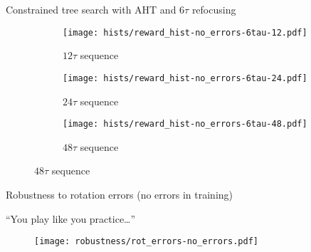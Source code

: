 \documentclass{beamer}
\begin{document}
\begin{frame}{Constrained tree search with AHT and $6\tau$ refocusing}
%
\begin{figure}[H]
    \centering
    \begin{subfigure}{.49\textwidth}
        \centering
        \texttt{[image: hists/reward\_hist-no\_errors-6tau-12.pdf]}
        \caption{$12\tau$ sequence}
        \label{fig:reward_hist-no_errors-6tau-12}
    \end{subfigure}
    \begin{subfigure}{.49\textwidth}
        \centering
        \texttt{[image: hists/reward\_hist-no\_errors-6tau-24.pdf]}
        \caption{$24\tau$ sequence}
        \label{fig:reward_hist-no_errors-6tau-24}
    \end{subfigure}
    \begin{subfigure}{.49\textwidth}
        \centering
        \texttt{[image: hists/reward\_hist-no\_errors-6tau-48.pdf]}
        \caption{$48\tau$ sequence}
        \label{fig:reward_hist-no_errors-6tau-48}
    \end{subfigure}
\end{figure}


\end{frame}



\begin{frame}
{Robustness to rotation errors (no errors in training)}

``You play like you practice\dots''

\begin{figure}
    \centering
    \texttt{[image: robustness/rot\_errors-no\_errors.pdf]}
\end{figure}


\end{frame}
\end{document}
